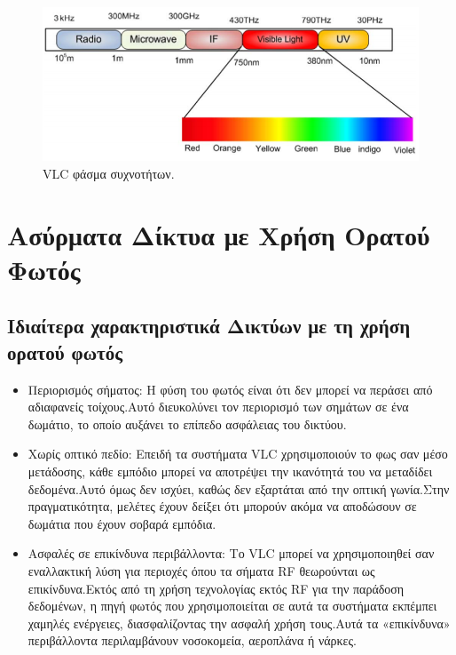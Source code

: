 \documentclass[conference]{IEEEtran}
\begin{document}
\begin{figure}[h]
  \includegraphics[width=\linewidth]{1.png}
  \caption{VLC φάσμα συχνοτήτων.}
 
\end{figure}

\section{Ασύρματα Δίκτυα με Χρήση Ορατού Φωτός}

\subsection{Ιδιαίτερα χαρακτηριστικά Δικτύων με τη χρήση ορατού φωτός \cite{b7}}

\begin{itemize}
\item Περιορισμός σήματος: 
Η φύση του φωτός είναι ότι δεν μπορεί να περάσει από αδιαφανείς τοίχους.Αυτό διευκολύνει τον περιορισμό των σημάτων σε ένα δωμάτιο, το οποίο αυξάνει το επίπεδο ασφάλειας του δικτύου.

\item Χωρίς οπτικό πεδίο: 
Επειδή τα συστήματα VLC χρησιμοποιούν το  φως σαν μέσο μετάδοσης, κάθε εμπόδιο μπορεί να αποτρέψει  την ικανότητά του να μεταδίδει δεδομένα.Αυτό όμως δεν ισχύει, καθώς δεν εξαρτάται από την οπτική γωνία.Στην πραγματικότητα, μελέτες έχουν δείξει ότι μπορούν ακόμα να αποδώσουν σε δωμάτια που έχουν σοβαρά εμπόδια.

\item Ασφαλές σε επικίνδυνα περιβάλλοντα:
Το VLC μπορεί να χρησιμοποιηθεί σαν εναλλακτική λύση για περιοχές όπου τα σήματα RF θεωρούνται ως επικίνδυνα.Εκτός από τη χρήση τεχνολογίας εκτός RF για την παράδοση δεδομένων, η πηγή φωτός που χρησιμοποιείται σε αυτά τα συστήματα εκπέμπει χαμηλές ενέργειες, διασφαλίζοντας την ασφαλή χρήση τους.Αυτά τα «επικίνδυνα» περιβάλλοντα περιλαμβάνουν νοσοκομεία, αεροπλάνα ή νάρκες.
\end{itemize}
\end{document}
